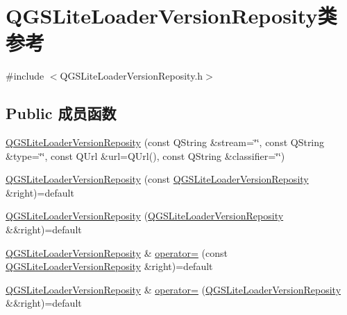 \hypertarget{class_q_g_s_lite_loader_version_reposity}{}\section{Q\+G\+S\+Lite\+Loader\+Version\+Reposity类 参考}
\label{class_q_g_s_lite_loader_version_reposity}


{\ttfamily \#include $<$Q\+G\+S\+Lite\+Loader\+Version\+Reposity.\+h$>$}

\subsection*{Public 成员函数}
\begin{DoxyCompactItemize}
\item 
\mbox{\hyperlink{class_q_g_s_lite_loader_version_reposity_af4500211910c5bd395d2db052d942372}{Q\+G\+S\+Lite\+Loader\+Version\+Reposity}} (const Q\+String \&stream=\char`\"{}\char`\"{}, const Q\+String \&type=\char`\"{}\char`\"{}, const Q\+Url \&url=Q\+Url(), const Q\+String \&classifier=\char`\"{}\char`\"{})
\item 
\mbox{\hyperlink{class_q_g_s_lite_loader_version_reposity_ad4adb050bb1272f41d9f00ee1bc2a360}{Q\+G\+S\+Lite\+Loader\+Version\+Reposity}} (const \mbox{\hyperlink{class_q_g_s_lite_loader_version_reposity}{Q\+G\+S\+Lite\+Loader\+Version\+Reposity}} \&right)=default
\item 
\mbox{\hyperlink{class_q_g_s_lite_loader_version_reposity_a68d7731f1354a5f4cb30488b2953d336}{Q\+G\+S\+Lite\+Loader\+Version\+Reposity}} (\mbox{\hyperlink{class_q_g_s_lite_loader_version_reposity}{Q\+G\+S\+Lite\+Loader\+Version\+Reposity}} \&\&right)=default
\item 
\mbox{\hyperlink{class_q_g_s_lite_loader_version_reposity}{Q\+G\+S\+Lite\+Loader\+Version\+Reposity}} \& \mbox{\hyperlink{class_q_g_s_lite_loader_version_reposity_a30c2620073ca47cc7aa54b94579c87e5}{operator=}} (const \mbox{\hyperlink{class_q_g_s_lite_loader_version_reposity}{Q\+G\+S\+Lite\+Loader\+Version\+Reposity}} \&right)=default
\item 
\mbox{\hyperlink{class_q_g_s_lite_loader_version_reposity}{Q\+G\+S\+Lite\+Loader\+Version\+Reposity}} \& \mbox{\hyperlink{class_q_g_s_lite_loader_version_reposity_a2ac18383a845d1bb59a0eb459855b65b}{operator=}} (\mbox{\hyperlink{class_q_g_s_lite_loader_version_reposity}{Q\+G\+S\+Lite\+Loader\+Version\+Reposity}} \&\&right)=default
\item 

\end{DoxyCompactItemize}
